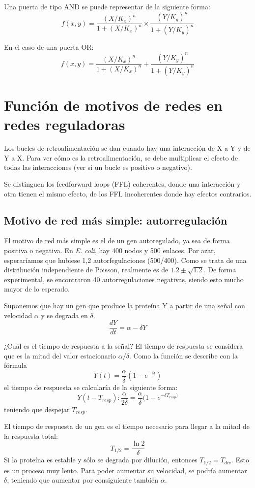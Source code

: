 Una puerta de tipo AND se puede representar de la siguiente forma:
$$f(x,y) = \frac{(X/K_x)^n}{1 + (X/K_x)^n} \times \frac{(Y/K_y)^n}{1 + (Y/K_y)^n}$$

En el caso de una puerta OR:
$$f(x,y) = \frac{(X/K_x)^n}{1 + (X/K_x)^n} + \frac{(Y/K_y)^n}{1 + (Y/K_y)^n}$$

\section{Función de motivos de redes en redes reguladoras}
Los bucles de retroalimentación se dan cuando hay una interacción de X a Y y de Y a X. Para ver cómo es la retroalimentación, se debe multiplicar el efecto de todas las interacciones (ver si un bucle es positivo o negativo).

Se distinguen los feedforward loops (FFL) coherentes, donde una interacción y otra tienen el mismo efecto, de los FFL incoherentes donde hay efectos contrarios.

\subsection{Motivo de red más simple: autorregulación}
El motivo de red más simple es el de un gen autoregulado, ya sea de forma positiva o negativa. En \textit{E. coli}, hay 400 nodos y 500 enlaces. Por azar, esperaríamos que hubiese 1,2 autorfegulaciones (500/400). Como se trata de una distribución independiente de Poisson, realmente es de $1.2 \pm \sqrt{1.2}$. De forma experimental, se encontraron 40 autorregulaciones negativas, siendo esto mucho mayor de lo esperado.

Suponemos que hay un gen que produce la proteína Y a partir de una señal con velocidad $\alpha$ y se degrada en $\delta$. 
$$\frac{dY}{dt} = \alpha - \delta Y$$

¿Cuál es el tiempo de respuesta a la señal? El tiempo de respuesta se considera que es la mitad del valor estacionario $\alpha/\delta$. Como la función se describe con la fórmula
$$Y(t) = \frac{\alpha}{\delta} (1 - e^{-\delta t})$$
el tiempo de respuesta se calcularía de la siguiente forma:
$$Y(t-T_{resp}): \frac{\alpha}{2 \delta} = \frac{\alpha}{\delta} (1 - e^{-\delta T_{resp})}$$
teniendo que despejar $T_{resp}$.

El tiempo de respuesta de un gen es el tiempo necesario para llegar a la mitad de la respuesta total:
$$T_{1/2} = \frac{\ln 2}{\delta}$$
Si la proteína es estable y sólo se degrada por dilución, entonces $T_{1/2} = T_{div}$. Esto es un proceso muy lento. Para poder aumentar su velocidad, se podría aumentar $\delta$, teniendo que aumentar por consiguiente también $\alpha$. 

